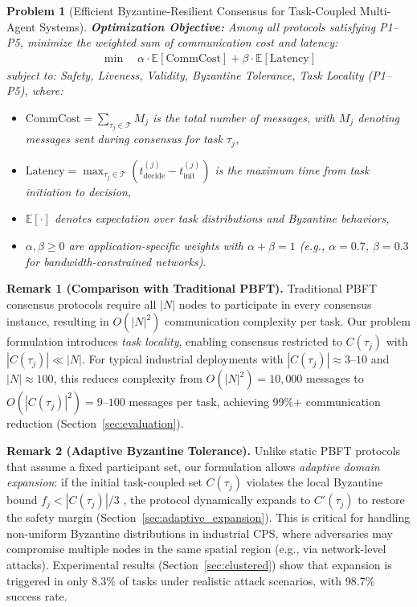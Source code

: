 \documentclass[lettersize,journal]{IEEEtran}
\newtheorem{problem}{Problem}
\begin{document}
\begin{problem}[Efficient Byzantine-Resilient Consensus for Task-Coupled Multi-Agent Systems]
\vspace{0.3cm}
\noindent \textbf{Optimization Objective:} Among all protocols satisfying 
P1--P5, minimize the weighted sum of communication cost and latency:
\begin{equation}
\begin{aligned}
\min \quad \alpha \cdot \mathbb{E}[\text{CommCost}] + 
\beta \cdot \mathbb{E}[\text{Latency}]
\label{eq:objective}
\end{aligned}
\end{equation}
subject to: Safety, Liveness, Validity, Byzantine Tolerance, Task Locality 
(P1--P5), where:
\begin{itemize}
    \item $\text{CommCost} = \sum_{\tau_j \in \mathcal{T}} M_j$ is the 
          total number of messages, with $M_j$ denoting messages sent 
          during consensus for task $\tau_j$,
    \item $\text{Latency} = \max_{\tau_j \in \mathcal{T}} 
          (t_{\text{decide}}^{(j)} - t_{\text{init}}^{(j)})$ is the maximum 
          time from task initiation to decision,
    \item $\mathbb{E}[\cdot]$ denotes expectation over task distributions 
          and Byzantine behaviors,
    \item $\alpha, \beta \geq 0$ are application-specific weights with 
          $\alpha + \beta = 1$ (e.g., $\alpha=0.7$, $\beta=0.3$ for 
          bandwidth-constrained networks).
\end{itemize}
\end{problem}

\vspace{0.3cm}
\noindent \textbf{Remark 1 (Comparison with Traditional PBFT).} Traditional 
PBFT consensus protocols require all $|N|$ nodes to participate in every consensus instance, 
resulting in $O(|N|^2)$ communication complexity per task. Our problem 
formulation introduces \textit{task locality}, enabling consensus 
restricted to $C(\tau_j)$ with $|C(\tau_j)| \ll |N|$. For typical 
industrial deployments with $|C(\tau_j)| \approx 3$--$10$ and $|N| \approx 100$, 
this reduces complexity from $O(|N|^2) = 10,000$ messages to 
$O(|C(\tau_j)|^2) = 9$--$100$ messages per task, achieving 99\%+ 
communication reduction (Section~\ref{sec:evaluation}).

\vspace{0.3cm}
\noindent \textbf{Remark 2 (Adaptive Byzantine Tolerance).} Unlike static 
PBFT protocols that assume a fixed participant set, our formulation allows \textit{adaptive domain expansion}: if the initial task-coupled set 
$C(\tau_j)$ violates the local Byzantine bound $f_j < |C(\tau_j)|/3$ , the protocol dynamically expands 
to $C'(\tau_j)$ to restore the safety margin (Section~\ref{sec:adaptive_expansion}). 
This is critical for handling non-uniform Byzantine distributions in 
industrial CPS, where adversaries may compromise multiple nodes in the 
same spatial region (e.g., via network-level attacks). Experimental results 
(Section~\ref{sec:clustered}) show that expansion is triggered in only 
8.3\% of tasks under realistic attack scenarios, with 98.7\% success rate.
\end{document}
